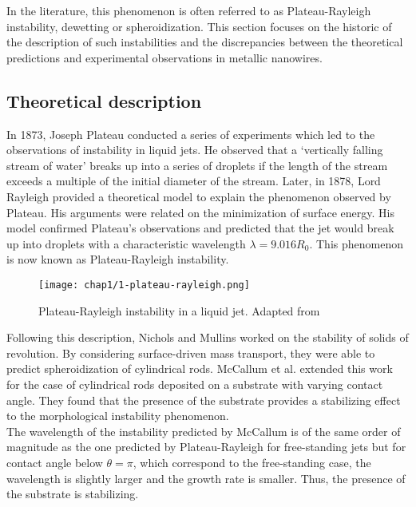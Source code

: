 In the literature, this phenomenon is often referred to as Plateau-Rayleigh instability, dewetting or spheroidization. This section focuses on the historic of the description of such instabilities and the discrepancies between the theoretical predictions and experimental observations in metallic nanowires.
\subsection{Theoretical description}
        In 1873, Joseph Plateau conducted a series of experiments which led to the observations of instability in liquid jets. He observed that a `vertically falling stream of water' breaks up into a series of droplets if the length of the stream exceeds a multiple of the initial diameter of the stream. Later, in 1878, Lord Rayleigh provided a theoretical model to explain the phenomenon observed by Plateau. His arguments were related on the minimization of surface energy. His model confirmed Plateau's observations and predicted that the jet would break up into droplets with a characteristic wavelength $\lambda = 9.016 R_0$. This phenomenon is now known as Plateau-Rayleigh instability.
        \begin{figure}[H]
                \centering
                \texttt{[image: chap1/1-plateau-rayleigh.png]}
                \caption{Plateau-Rayleigh instability in a liquid jet. Adapted from \cite{Rutland1970}}
                \label{fig:plateau-rayleigh}
        \end{figure}
        Following this description, Nichols and Mullins \cite{NicholsMullins1965} worked on the stability of solids of revolution. By considering surface-driven mass transport, they were able to predict spheroidization of cylindrical rods. McCallum et al. \cite{McCallum1996} extended this work for the case of cylindrical rods deposited on a substrate with varying contact angle. They found that the presence of the substrate provides a stabilizing effect to the morphological instability phenomenon.\\
        The wavelength of the instability predicted by McCallum is of the same order of magnitude as the one predicted by Plateau-Rayleigh for free-standing jets but for contact angle below $\theta=\pi$, which correspond to the free-standing case, the wavelength is slightly larger and the growth rate is smaller. Thus, the presence of the substrate is stabilizing.
